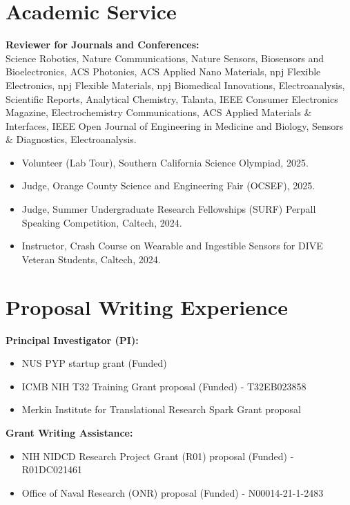 \documentclass[11pt,a4paper]{article}
\begin{document}
\section{Academic Service}
\textbf{Reviewer for Journals and Conferences:} \\
Science Robotics, Nature Communications, Nature Sensors, Biosensors and Bioelectronics, ACS Photonics, ACS Applied Nano Materials, npj Flexible Electronics, npj Flexible Materials, npj Biomedical Innovations, Electroanalysis, Scientific Reports, Analytical Chemistry, Talanta, IEEE Consumer Electronics Magazine, Electrochemistry Communications, ACS Applied Materials \& Interfaces, IEEE Open Journal of Engineering in Medicine and Biology, Sensors \& Diagnostics, Electroanalysis.
\begin{itemize}[leftmargin=*, itemsep=2pt, parsep=0pt, topsep=2pt]
  \item Volunteer (Lab Tour), Southern California Science Olympiad, 2025.
  \item Judge, Orange County Science and Engineering Fair (OCSEF), 2025.
  \item Judge, Summer Undergraduate Research Fellowships (SURF) Perpall Speaking Competition, Caltech, 2024.
  \item Instructor, Crash Course on Wearable and Ingestible Sensors for DIVE Veteran Students, Caltech, 2024.
\end{itemize}

\section{Proposal Writing Experience}
\textbf{Principal Investigator (PI):}
\begin{itemize}[leftmargin=*, itemsep=2pt, parsep=0pt, topsep=2pt]
  \item NUS PYP startup grant (Funded)
  \item ICMB NIH T32 Training Grant proposal (Funded) - T32EB023858
  \item Merkin Institute for Translational Research Spark Grant proposal
\end{itemize}
\vspace{6pt}
\textbf{Grant Writing Assistance:}
\begin{itemize}[leftmargin=*, itemsep=2pt, parsep=0pt, topsep=2pt]
  \item NIH NIDCD Research Project Grant (R01) proposal (Funded) - R01DC021461
  \item Office of Naval Research (ONR) proposal (Funded) - N00014-21-1-2483
\end{itemize}
\end{document}
